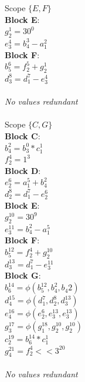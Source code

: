 \documentclass[11pt]{article}
\begin{document}
\begin{enumerate}
\begin{Answer}
		      Scope $\{E, F\}$ \\
		      \textbf{Block E}: \\
		      $g_2^1 = 30^0$ \\
		      $e_3^4 = b_4^3 - a_1^2$ \\
		      \textbf{Block F}: \\
		      $b_5^6 = f_2^5 + g_2^1$ \\
		      $d_3^8 = d_1^7 - e_3^4$ \\
		      \\
		      \textit{No values redundant} \\
		      \\

		      Scope $\{C, G\}$ \\
		      \textbf{Block C}: \\
		      $b_4^2 = b_3^0 * c_1^1$ \\
		      $f_2^4 = 1^3$ \\
		      \textbf{Block D}: \\
		      $e_2^6 = a_1^5 + b_4^2$ \\
		      $d_2^8 = d_1^7 - e_2^6$ \\
		      \textbf{Block E}: \\
		      $g_2^{10} = 30^9$ \\
		      $e_3^{11} = b_4^2 - a_1^5$ \\
		      \textbf{Block F}: \\
		      $b_5^{12} = f_2^4 + g_2^{10}$ \\
		      $d_3^{13} = d_1^7 - e_3^{11}$ \\
		      \textbf{Block G}: \\
		      $b_6^{14} = \phi(b_5^{12}, b_4^{2}, b_4{2})$ \\
		      $d_4^{15} = \phi(d_1^7, d_2^8, d_3^{13})$ \\
		      $e_4^{16} = \phi(e_2^6, e_3^{13}, e_3^{13})$ \\
		      $g_3^{17} = \phi(g_1^{18}, g_2^{10}, g_2^{10})$ \\
		      $c_2^{19} = b_6^{14} * c_1^1$ \\
		      $g_4^{21} = f_2^4 << 3^{20}$ \\
		      \\
		      \textit{No values redundant} \\
		      \\


\end{Answer}
\end{enumerate}
\end{document}
